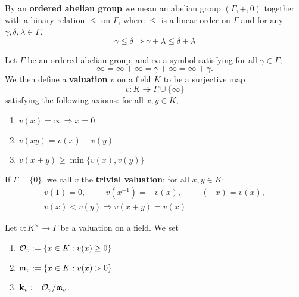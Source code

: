 \documentclass[11pt]{article}
\begin{document}
By an \textbf{ordered abelian group} we mean an abelian group \((\Gamma,+,0)\) together with a binary
relation \(\le\) on \(\Gamma\), where \(\le\) is a linear order on \(\Gamma\) and for any \(\gamma,\delta,\lambda\in\Gamma\),
\begin{equation*}
\gamma\le\delta\Rightarrow\gamma+\lambda\le\delta+\lambda
\end{equation*}

Let \(\Gamma\) be an ordered abelian group, and \(\infty\) a symbol satisfying for all \(\gamma\in\Gamma\),
\begin{equation*}
\infty=\infty+\infty=\gamma+\infty=\infty+\gamma.
\end{equation*}
We then define a \textbf{valuation} \(v\) on a field \(K\) to be a surjective map
\begin{equation*}
v:K\twoheadrightarrow\Gamma\cup\{\infty\}
\end{equation*}
satisfying the following axioms: for all \(x,y\in K\),
\begin{enumerate}
\item \(v(x)=\infty\Rightarrow x=0\)
\item \(v(xy)=v(x)+v(y)\)
\item \(v(x+y)\ge\min\{v(x),v(y)\}\)
\end{enumerate}

If \(\Gamma=\{0\}\), we call \(v\) the \textbf{trivial valuation}; for all \(x,y\in K\):
\begin{gather*}
v(1)=0,\hspace{1cm}v(x^{-1})=-v(x),\hspace{1cm}(-x)=v(x),\\
v(x)<v(y)\Rightarrow v(x+y)=v(x)
\end{gather*}

\begin{definition}[]
Let \(v:K^\times\to\Gamma\) be a valuation on a field. We set
\begin{enumerate}
\item \(\mathcal{O}_v:=\{x\in K:v(x)\ge 0\}\)
\item \(\mathfrak{m}_v:=\{x\in K:v(x)>0\}\)
\item \(\operatorname{\textbf{k}}_v:=\mathcal{O}_v/\mathfrak{m}_v\).
\end{enumerate}
\end{definition}
\end{document}
